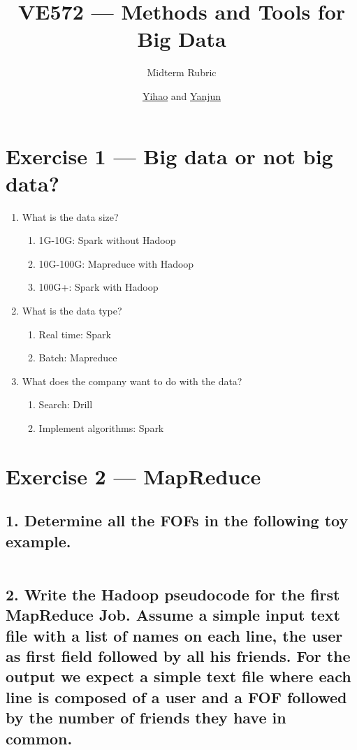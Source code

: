 \documentclass[11pt,a4paper]{article}
\title{VE572 --- Methods and Tools for Big Data}
\subtitle{Midterm Rubric}
\author{\href{mailto:liuyh615@sjtu.edu.cn}{Yihao} and \href{mailto:AuroraZYJ@sjtu.edu.cn}{Yanjun}}
\begin{document}
\maketitle

\section*{Exercise 1 --- Big data or not big data?}
\begin{enumerate}
	\item What is the data size?
	\begin{enumerate}
		\item 1G-10G: Spark without Hadoop
		\item 10G-100G: Mapreduce with Hadoop
		\item 100G+: Spark with Hadoop
	\end{enumerate}
	\item What is the data type?
	\begin{enumerate}
		\item Real time: Spark
		\item Batch: Mapreduce
	\end{enumerate}
	\item What does the company want to do with the data?
	\begin{enumerate}
		\item Search: Drill
		\item Implement algorithms: Spark
	\end{enumerate}
\end{enumerate}


\section*{Exercise 2 --- MapReduce}

\subsection*{1. Determine all the FOFs in the following toy example.}

\inputminted{shell}{../data.txt}

\subsection*{2. Write the Hadoop pseudocode
for the first MapReduce Job. Assume a simple input text file
with a list of names on each line, the user as first field followed by all his friends. For the
output we expect a simple text file where each line is composed of a user and a FOF followed
by the number of friends they have in common.}
\end{document}
